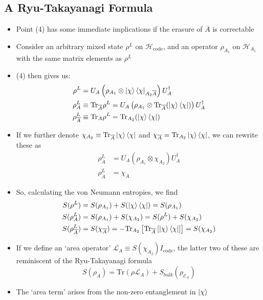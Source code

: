 \documentclass[12pt,a4paper]{article}
\numberwithin{equation}{section}
\newcommand{\ketbra}[2]{\ket{#1}\bra{#2}}
\newcommand{\ketbras}[1]{\ketbra{#1}{#1}}
\newcommand{\Hcode}{\mathcal{H}_{\text{code}}}
\begin{document}
	\subsection{A Ryu-Takayanagi Formula}
	\begin{itemize}
		\item Point (4) has some immediate implications if the erasure of $\overline{A}$ is correctable
		\item Consider an arbitrary mixed state $\rho^{L}$ on $\Hcode$, and an operator $\rho_{A_{1}}$ on $\mathcal{H}_{A_{1}}$ with the same matrix elements as $\rho^{L}$
		\item (4) then gives us:
		\begin{equation}
			\begin{aligned}
				\rho^{L}&=U_{A}\left(\rho_{A_{1}}\otimes\ketbras{\chi}_{A_{2}\overline{A}}\right)U_{A}^{\dagger}\\
				\rho^{L}_{A}&\equiv\text{Tr}_{\overline{A}}\rho^{L}=U_{A}\left(\rho_{A_{1}}\otimes\text{Tr}_{\overline{A}}(\ketbras{\chi})\right)U_{A}^{\dagger}\\
				\rho^{L}_{\overline{A}}&\equiv \text{Tr}_{A}\rho^{L}=\text{Tr}_{A_{2}}(\ketbras{\chi})
			\end{aligned}
		\end{equation}
		\item If we further denote $\chi_{A_{2}}\equiv\text{Tr}_{\overline{A}}\ketbras{\chi}$ and $\chi_{\overline{A}}=\text{Tr}_{A_{2}}\ketbras{\chi}$, we can rewrite these as
		\begin{equation}
			\begin{aligned}
				\rho_{A}^{L}&=U_{A}\left(\rho_{A_{1}}\otimes\chi_{A_{2}}\right)U_{A}^{\dagger}\\
				\rho_{\overline{A}}^{L}&=\chi_{\overline{A}}
			\end{aligned}
		\end{equation}
		\item So, calculating the von Neumann entropies, we find
		\begin{equation}
			\begin{aligned}
				S(\rho^{L})&=S(\rho_{A_{1}})+S(\ketbras{\chi})=S(\rho_{A_{1}})\\
				S(\rho^{L}_{A})&=S(\rho_{A_{1}})+S(\chi_{A_{2}})=S(\rho^{L})+S(\chi_{A_{2}})\\
				S(\rho_{\overline{A}}^{L})&=S(\chi_{\overline{A}})=-\text{Tr}_{A_{2}}\left[\text{Tr}_{\overline{A}}\left[\ketbras{\chi}\right]\right]=S(\chi_{A_{2}})
			\end{aligned}
		\end{equation}
		\item If we define an `area operator' $\mathcal{L}_{A}\equiv S(\chi_{A_{2}})I_{\text{code}}$, the latter two of these are reminiscent of the Ryu-Takayanagi formula
		\begin{equation}
			S(\rho_{A})=\text{Tr}(\rho\mathcal{L}_{A})+S_{bulk}(\rho_{\mathcal{E}_{A}})
		\end{equation}
		\item The `area term' arises from the non-zero entanglement in $\ket{\chi}$
	\end{itemize}
\end{document}
